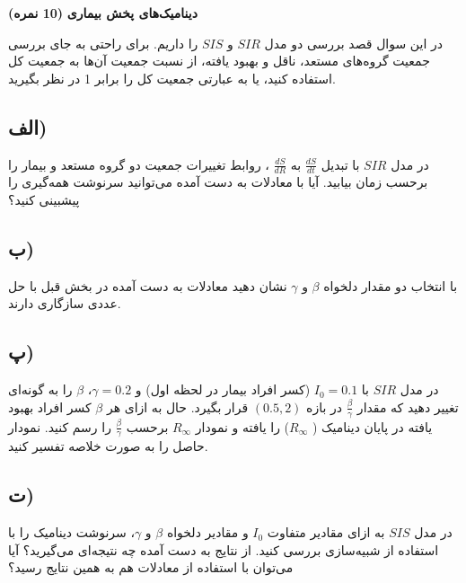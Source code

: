 \Large \textbf{دینامیک‌های پخش بیماری}
\large \textbf{(10 نمره)}

\normalsize \vspace{0.5cm}
در این سوال قصد بررسی دو مدل 
$SIR$ و $SIS$ را داریم. برای راحتی به جای بررسی جمعیت گروه‌های مستعد، ناقل و بهبود یافته، از نسبت جمعیت آن‌ها به جمعیت کل استفاده کنید، یا به عبارتی جمعیت کل را برابر 1 در نظر بگیرید.
\subsection*{الف)}
در مدل 
$SIR$ 
با تبدیل 
$\frac{dS}{dt}$ به
$\frac{dS}{dR}$ ، روابط تغییرات جمعیت دو گروه مستعد و بیمار را برحسب زمان بیابید. آیا با معادلات به دست آمده می‌توانید سرنوشت همه‌گیری را پیشبینی کنید؟ 
\subsection*{ب)}
با انتخاب دو مقدار دلخواه 
$\beta$ و $\gamma$ نشان دهید معادلات به دست آمده در بخش قبل با حل عددی سازگاری دارند.

\subsection*{پ)}
در مدل 
$SIR$ 
با 
$I_0=0.1$ (کسر افراد بیمار در لحظه اول) و 
$\gamma=0.2$، 
$\beta$ را به گونه‌ای تغییر دهید که مقدار 
$\frac{\beta}{\gamma}$ در بازه 
$(0.5,2)$ قرار بگیرد. حال به ازای هر 
$\beta$ کسر افراد بهبود یافته در پایان دینامیک (
$R_{\infty}$) را یافته و نمودار 
$R_{\infty}$ برحسب 
$\frac{\beta}{\gamma}$ را رسم کنید. نمودار حاصل را به صورت خلاصه تفسیر کنید.
\subsection*{ت)}
در مدل 
$SIS$
به ازای مقادیر متفاوت 
$I_0$ و مقادیر دلخواه
$\beta$ و $\gamma$، سرنوشت دینامیک را با استفاده از شبیه‌سازی بررسی کنید. از 
نتایج به دست آمده چه نتیجه‌ای می‌گیرید؟
آیا می‌توان با استفاده از معادلات هم به همین نتایج رسید؟
